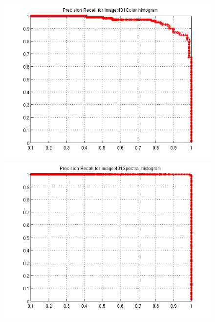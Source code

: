 \documentclass[a4paper,12pt]{article}
\begin{document}
\begin{figure}[h!]
    \centering
    \includegraphics[totalheight=.24\textheight]{../Results/PR/GoodColor.png}
    \includegraphics[totalheight=.24\textheight]{../Results/PR/GoodSpectral.png}
    \label{fig:good}
\end{figure}
\end{document}
